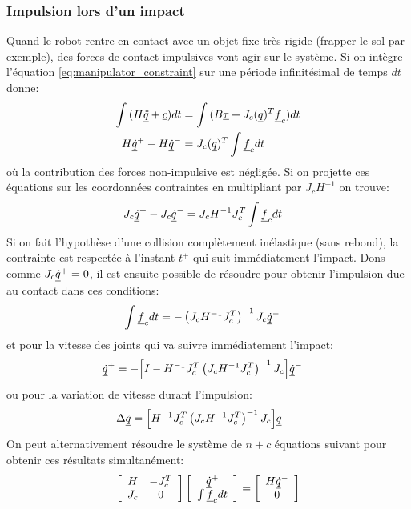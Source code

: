 \subsubsection{Impulsion lors d'un impact}
\label{sec:impact}
%
Quand le robot rentre en contact avec un objet fixe très rigide (frapper le sol par exemple), des forces de contact impulsives vont agir sur le système. Si on intègre l'équation \eqref{eq:manipulator_constraint} sur une période infinitésimal de temps $dt$ donne:
%
\begin{align}
\int{ ( H \underline{\ddot{q}} + \underline{c} ) dt } &= \int{ ( B \underline{\tau} + J_c( \underline{ q } )^T  \underline{f}_c ) dt } \\
H \underline{\dot{q}}^+ - H \underline{\dot{q}}^- &= J_c( \underline{ q } )^T  \int{  \underline{f}_c dt }
\label{eq:manipulator_impact}
\end{align}
%
où la contribution des forces non-impulsive est négligée. Si on projette ces équations sur les coordonnées contraintes en multipliant par $J_c H^{-1}$ on trouve:
%
\begin{align}
J_c \underline{\dot{q}}^+ - J_c \underline{\dot{q}}^- &= J_c H^{-1} J_c^T  \int{  \underline{f}_c dt }
\label{eq:manipulator_impact2}
\end{align}
%
Si on fait l'hypothèse d'une collision complètement inélastique (sans rebond), la contrainte est respectée à l'instant $t^+$ qui suit immédiatement l'impact. Dons comme $J_c \underline{\dot{q}}^+=0$, il est ensuite possible de résoudre pour obtenir l'impulsion due au contact dans ces conditions:
\begin{align}
\int{  \underline{f}_c dt } &= - \left( J_c H^{-1} J_c^T \right)^{-1}  J_c \underline{\dot{q}}^-
\label{eq:manipulator_impact_force}
\end{align}
%
et pour la vitesse des joints qui va suivre immédiatement l'impact:
%
\begin{align}
\underline{\dot{q}}^+ &= - \Big[ I - H^{-1} J_c^T \left( J_c H^{-1} J_c^T \right)^{-1} J_c \Big] \underline{\dot{q}}^-
\label{eq:manipulator_impact_velocity}
\end{align}
%
ou pour la variation de vitesse durant l'impulsion:
%
\begin{align}
\Delta \underline{\dot{q}} &=  \Big[ H^{-1} J_c^T \left( J_c H^{-1} J_c^T \right)^{-1} J_c \Big] \underline{\dot{q}}^-
\label{eq:manipulator_impact_velocity_delta}
\end{align}
%
On peut alternativement résoudre le système de $n+c$ équations suivant pour obtenir ces résultats simultanément:
%
\begin{align}
\left[ \begin{array}{c c } 	H & -J_c^T  \\ J_c 	& 0  	\end{array} \right] \left[ \begin{array}{c} \underline{\dot{q}}^+  \\ \int{ \underline{f}_c dt }\end{array} \right] = \left[ \begin{array}{c}  	H \underline{\dot{q}}^-   \\ 0  \end{array} \right]
\label{eq:manipulator_impact_eom}
\end{align}






